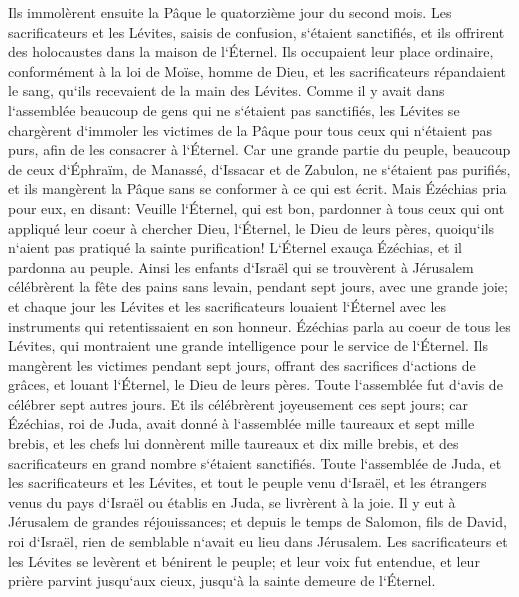 \verse Ils immolèrent ensuite la Pâque le quatorzième jour du second mois. Les sacrificateurs et les Lévites, saisis de confusion, s`étaient sanctifiés, et ils offrirent des holocaustes dans la maison de l`Éternel. 
\verse Ils occupaient leur place ordinaire, conformément à la loi de Moïse, homme de Dieu, et les sacrificateurs répandaient le sang, qu`ils recevaient de la main des Lévites. 
\verse Comme il y avait dans l`assemblée beaucoup de gens qui ne s`étaient pas sanctifiés, les Lévites se chargèrent d`immoler les victimes de la Pâque pour tous ceux qui n`étaient pas purs, afin de les consacrer à l`Éternel. 
\verse Car une grande partie du peuple, beaucoup de ceux d`Éphraïm, de Manassé, d`Issacar et de Zabulon, ne s`étaient pas purifiés, et ils mangèrent la Pâque sans se conformer à ce qui est écrit. Mais Ézéchias pria pour eux, en disant: Veuille l`Éternel, qui est bon, 
\verse pardonner à tous ceux qui ont appliqué leur coeur à chercher Dieu, l`Éternel, le Dieu de leurs pères, quoiqu`ils n`aient pas pratiqué la sainte purification! 
\verse L`Éternel exauça Ézéchias, et il pardonna au peuple. 
\verse Ainsi les enfants d`Israël qui se trouvèrent à Jérusalem célébrèrent la fête des pains sans levain, pendant sept jours, avec une grande joie; et chaque jour les Lévites et les sacrificateurs louaient l`Éternel avec les instruments qui retentissaient en son honneur. 
\verse Ézéchias parla au coeur de tous les Lévites, qui montraient une grande intelligence pour le service de l`Éternel. Ils mangèrent les victimes pendant sept jours, offrant des sacrifices d`actions de grâces, et louant l`Éternel, le Dieu de leurs pères. 
\verse Toute l`assemblée fut d`avis de célébrer sept autres jours. Et ils célébrèrent joyeusement ces sept jours; 
\verse car Ézéchias, roi de Juda, avait donné à l`assemblée mille taureaux et sept mille brebis, et les chefs lui donnèrent mille taureaux et dix mille brebis, et des sacrificateurs en grand nombre s`étaient sanctifiés. 
\verse Toute l`assemblée de Juda, et les sacrificateurs et les Lévites, et tout le peuple venu d`Israël, et les étrangers venus du pays d`Israël ou établis en Juda, se livrèrent à la joie. 
\verse Il y eut à Jérusalem de grandes réjouissances; et depuis le temps de Salomon, fils de David, roi d`Israël, rien de semblable n`avait eu lieu dans Jérusalem. 
\verse Les sacrificateurs et les Lévites se levèrent et bénirent le peuple; et leur voix fut entendue, et leur prière parvint jusqu`aux cieux, jusqu`à la sainte demeure de l`Éternel. 

\chapter{}

